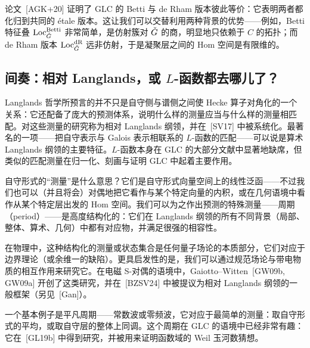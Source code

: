 论文~[AGK+20] 证明了 GLC 的 Betti 与 de Rham 版本彼此等价：它表明两者都化归到共同的 étale 版本。这让我们可以交替利用两种背景的优势——例如，Betti 特征叠 $\operatorname{Loc}^{\mathrm{Betti}}_{\check{G}}$ 非常简单，是仿射簇对 $\check{G}$ 的商，明显地只依赖于 $C$ 的拓扑；而 de Rham 版本 $\operatorname{Loc}^{\mathrm{dR}}_{\check{G}}$ 远非仿射，于是凝聚层之间的 Hom 空间是有限维的。

\subsection{间奏：相对 Langlands，或 $L$-函数都去哪儿了？}\label{sec:5.2}

Langlands 哲学所预言的并不只是自守侧与谱侧之间使 Hecke 算子对角化的一个关系：它还配备了庞大的预测体系，说明什么样的测量应当与什么样的测量相匹配。对这些测量的研究称为相对 Langlands 纲领，并在~[SV17] 中被系统化。最著名的一项——把自守表示与 Galois 表示相联系的 $L$-函数的匹配——可以说是算术 Langlands 纲领的主要特征。$L$-函数本身在 GLC 的大部分文献中显著地缺席，但类似的匹配测量在归一化、刻画与证明 GLC 中起着主要作用。

自守形式的“测量”是什么意思？它们是自守形式向量空间上的线性泛函——不过我们也可以（并且将会）对偶地把它看作与某个特定向量的内积，或在几何语境中看作从某个特定层出发的 Hom 空间。我们可以为之作出预测的特殊测量——周期（period）——是高度结构化的：它们在 Langlands 纲领的所有不同背景（局部、整体、算术、几何）中都有对应物，并满足很强的相容性。

在物理中，这种结构化的测量或状态集合是任何量子场论的本质部分，它们对应于边界理论（或余维一的缺陷）。更具启发性的是，我们可以通过规范场论与带电物质的相互作用来研究它。在电磁 S-对偶的语境中，Gaiotto–Witten~[GW09b, GW09a] 开创了这类研究，并在~[BZSV24] 中被提议为相对 Langlands 纲领的一般框架（另见~[Gan]）。

一个基本例子是平凡周期——常数波或零频波，它对应于最简单的测量：取自守形式的平均，或取自守层的整体上同调。这个周期在 GLC 的语境中已经非常有趣：它在~[GL19b] 中得到研究，并被用来证明函数域的 Weil 玉河数猜想。

